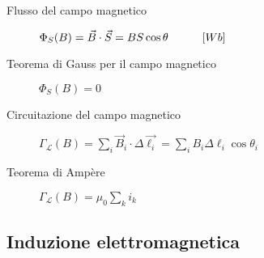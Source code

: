 \documentclass[a4paper,11pt,italian]{article}
\begin{document}
\begin{description}
  
  \item[Flusso del campo magnetico] 
  $ \Phi_S(B) = \vec{B} \cdot \vec{S} = B S \cos \theta \hspace*{3em} [Wb] $
  
  \item[Teorema di Gauss per il campo magnetico] 
  $ \Phi_S(B) = 0 $
  
  \item[Circuitazione del campo magnetico]\label{conc:circuitazioneB}
  $ \Gamma_\mathscr{L}(B) = \sum_i \vec{B}_i \cdot \Delta\vec{\ell_i} = \sum_i B_i \Delta \ell_i \cos \theta_i $
  
  \item[Teorema di Ampère] 
  $ \Gamma_\mathscr{L}(B) = \mu_0 \sum_k i_k $
\end{description}

\subsection{Induzione elettromagnetica}
\end{document}

